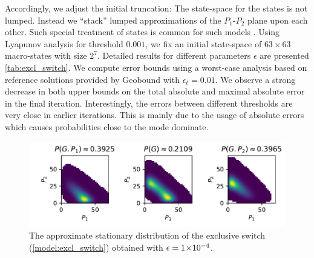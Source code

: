 Accordingly, we adjust
the initial truncation:
The state-space for the  states is not lumped. Instead we ``stack''
lumped approximations of the $P_1$-$P_2$ plane upon each other.
Such special treatment of  states is common for such models \parencite{lapin2011shave}.
Using Lyapunov analysis for threshold $0.001$, we fix an initial state-space of $63\times 63$ macro-states with size $2^7$. Detailed results for different parameters $\epsilon$ are presented \autoref{tab:excl_switch}.
We compute error bounds using a worst-case analysis based on reference solutions provided by Geobound with $\epsilon_{\ell}=0.01$.
We observe a strong decrease in both upper bounds on the total absolute and maximal absolute error in the final iteration.
Interestingly, the errors between different thresholds are very close in earlier iterations.
This is mainly due to the usage of absolute errors which causes probabilities close to the mode dominate.
\begin{figure}[htb]
    \centering
    \includegraphics[width=\textwidth]{gfx/gexpr_approx.pdf}
	\caption[Approximate stationary distribution of the exclusive switch]{The approximate stationary distribution of the exclusive switch (\autoref{model:excl_switch}) obtained with $\epsilon= 1\!\times\hspace{-.5ex} 10^{-4} $.}
    \label{fig:excl_switch:excl_switch_dist}
\end{figure}



